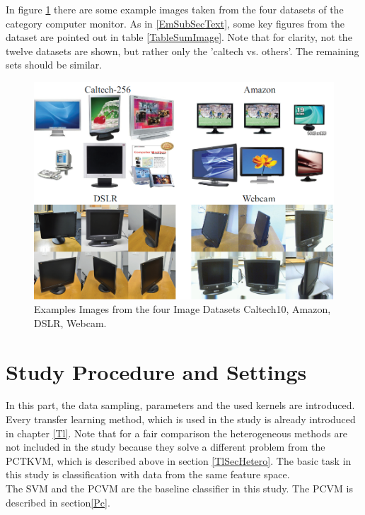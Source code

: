In figure \ref{FigExampleImages} there are some example images taken from the four datasets of the category computer monitor. 
As in \ref{EmSubSecText}, some key figures from the dataset are pointed out in table \ref{TableSumImage}.
Note that for clarity, not the twelve datasets are shown, but rather only the 'caltech vs. others'.
The remaining sets should be similar.
\begin{figure}[]
	\centering
	\includegraphics[width=.8\linewidth]{figures/ExampleImages.png}
	\caption[Example from Image Dataset]{Examples Images from the four Image Datasets Caltech10, Amazon, DSLR, Webcam. \cite{Gong.}}
	\label{FigExampleImages}
\end{figure}
\section{Study Procedure and Settings}\label{EmSecStudy}
In this part, the data sampling, parameters and the used kernels are introduced.
Every transfer learning method, which is used in the study is already introduced in chapter \ref{Tl}.
Note that for a fair comparison the heterogeneous methods are not included in the study because they solve a different problem from the \acs{PCTKVM}, which is described above in section \ref{TlSecHetero}.
The basic task in this study is classification with data from the same feature space.\\
The \ac{SVM} and the \acl{PCVM} are the baseline classifier in this study.
The \acs{PCVM} is described in section\ref{Pc}.\\

